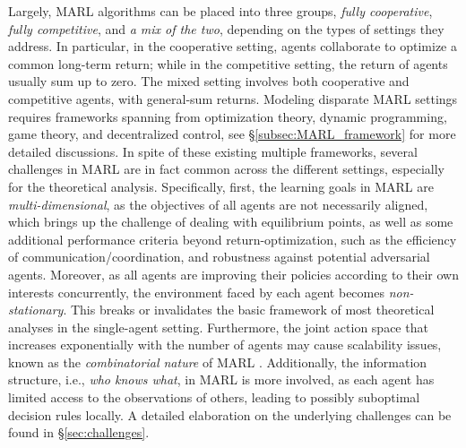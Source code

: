 Largely, MARL algorithms can be placed   into   three groups, \emph{fully cooperative}, \emph{fully competitive}, and \emph{a mix of the two},  depending on the types of settings they address. In particular, in  the cooperative setting, agents   collaborate to optimize a common long-term return; while in the competitive setting, the return of agents usually sum up to zero. The mixed setting involves both cooperative and competitive agents, with general-sum returns. Modeling disparate MARL settings requires frameworks spanning from optimization theory, dynamic programming, game theory, and decentralized control, see \S\ref{subsec:MARL_framework} for more detailed discussions. In spite of these   existing multiple frameworks, several challenges in MARL  are in fact common across the different  settings, especially for the theoretical analysis.  Specifically, first, the learning goals in MARL are \emph{multi-dimensional}, as the objectives of all agents are not necessarily aligned, which brings up the challenge of dealing with equilibrium points, as well as  some additional   performance criteria beyond return-optimization, such as  the efficiency of communication/coordination, and  robustness against potential adversarial agents. Moreover, as all agents are improving their policies according to their own interests   concurrently, the environment faced by each agent becomes \emph{non-stationary}. This breaks or invalidates the basic framework of most  theoretical analyses in the single-agent setting. Furthermore, the joint action space that increases exponentially with the number of agents may cause scalability issues, known as the \emph{combinatorial nature} of MARL \cite{hernandez2018multiagent}. Additionally, the information structure, i.e., \emph{who knows what},  in MARL is more involved, as each agent has limited access to the observations of others, leading to possibly suboptimal decision rules locally. A detailed elaboration on the underlying  challenges can be found in \S\ref{sec:challenges}. 


